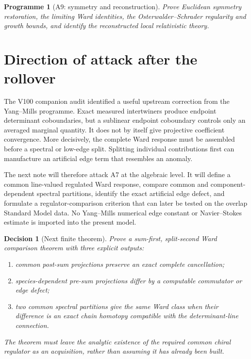 \documentclass[11pt]{article}
\newtheorem{programme}[theorem]{Programme}
\newtheorem{decision}[theorem]{Decision}
\begin{document}
\begin{programme}[A9: symmetry and reconstruction]
\label{prog:v11v1-a9}
Prove Euclidean symmetry restoration, the limiting Ward identities, the
Osterwalder--Schrader regularity and growth bounds, and identify the
reconstructed local relativistic theory.
\end{programme}

\section{Direction of attack after the rollover}
\label{sec:v11v1-direction}

The V100 companion audit identified a useful upstream correction from the
Yang--Mills programme.  Exact measured intertwiners produce endpoint
determinant coboundaries, but a sublinear endpoint coboundary controls only
an averaged marginal quantity.  It does not by itself give projective
coefficient convergence.  More decisively, the complete Ward response
must be assembled before a spectral or low-edge split.  Splitting
individual contributions first can manufacture an artificial edge term
that resembles an anomaly.

The next note will therefore attack A7 at the algebraic level.  It will
define a common line-valued regulated Ward response, compare common and
component-dependent spectral partitions, identify the exact artificial
edge defect, and formulate a regulator-comparison criterion that can later
be tested on the overlap Standard Model data.  No Yang--Mills numerical
edge constant or Navier--Stokes estimate is imported into the present
model.

\begin{decision}[Next finite theorem]
\label{dec:v11v1-next}
Prove a sum-first, split-second Ward comparison theorem with three explicit
outputs:
\begin{enumerate}[label=\textnormal{(\alph*)}]
\item common post-sum projections preserve an exact complete cancellation;
\item species-dependent pre-sum projections differ by a computable
commutator or edge defect;
\item two common spectral partitions give the same Ward class when their
difference is an exact chain homotopy compatible with the determinant-line
connection.
\end{enumerate}
The theorem must leave the analytic existence of the required common
chiral regulator as an acquisition, rather than assuming it has already
been built.
\end{decision}
\end{document}
